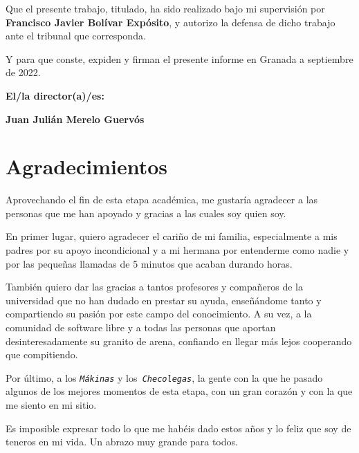 \vspace{0.5cm}

Que el presente trabajo, titulado\texttt{},
ha sido realizado bajo mi supervisión por \textbf{Francisco Javier Bolívar Expósito}, y autorizo la defensa de dicho trabajo ante el tribunal
que corresponda.

\vspace{0.5cm}

Y para que conste, expiden y firman el presente informe en Granada a septiembre de 2022.

\vspace{1cm}

\textbf{El/la director(a)/es: }

\vspace{5cm}

\noindent \textbf{Juan Julián Merelo Guervós}

\chapter*{Agradecimientos}

Aprovechando el fin de esta etapa académica, me gustaría agradecer a las personas que me han apoyado y gracias a las cuales soy quien soy.

En primer lugar, quiero agradecer el cariño de mi familia, especialmente a mis padres por su apoyo incondicional y a mi hermana por entenderme como nadie y por las pequeñas llamadas de 5 minutos que acaban durando horas.

También quiero dar las gracias a tantos profesores y compañeros de la universidad que no han dudado en prestar su ayuda, enseñándome tanto y compartiendo su pasión por este campo del conocimiento. A su vez, a la comunidad de software libre y a todas las personas que aportan desinteresadamente su granito de arena, confiando en llegar más lejos cooperando que compitiendo. 

Por último, a los \texttt{\normalfont\textit{Mákinas}} y los\texttt{\normalfont\textit{ Checolegas}}, la gente con la que he pasado algunos de los mejores momentos de esta etapa, con un gran corazón y con la que me siento en mi sitio.

Es imposible expresar todo lo que me habéis dado estos años y lo feliz que soy de teneros en mi vida. Un abrazo muy grande para todos.

\vspace*{1cm}

